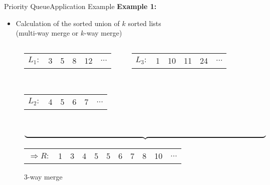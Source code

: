 \begin{frame}{Priority Queue}{Application Example}
  \textbf{Example 1:}
  \begin{itemize}
    \item
      Calculation of the sorted union of $k$ sorted lists\\
      (multi-way merge or $k$-way merge)
  \end{itemize}
  \begin{figure}[!h]
    \begin{columns}
      \begin{column}[t]{0.5\linewidth}
        \begin{tabularx}{\linewidth}{c|X|X|X|X|X|}
          \cline{2-6}
          $L_1:$ & 3 & 5 & 8 & 12 & $\dots$\\
          \cline{2-6}
        \end{tabularx}
        \hfill\\[1.25em]
        \begin{tabularx}{\linewidth}{c|X|X|X|X|X|}
          \cline{2-6}
          $L_2:$ & 4 & 5 & 6 & 7 & $\dots$\\
          \cline{2-6}
        \end{tabularx}
      \end{column}
      \begin{column}[t]{0.5\textwidth}
        \begin{tabularx}{\linewidth}{c|X|X|X|X|X|}
          \cline{2-6}
          $L_3:$ & 1 & 10 & 11 & 24 & $\dots$\\
          \cline{2-6}
        \end{tabularx}
      \end{column}
    \end{columns}
    \hfill\\
    $\underbrace{\hspace{\linewidth}}$\\[0.5em]
    \begin{tabularx}{\linewidth}{c|X|X|X|X|X|X|X|X|X|X|}
      \cline{2-11}
      $\Rightarrow R:$ & 1 & 3 & 4 & 5 & 5 & 6 & 7 & 8 & 10 & $\dots$\\
      \cline{2-11}
    \end{tabularx}
    \caption{3-way merge}
    \label{fig:priority_queue:three_way_merge}
  \end{figure}
\end{frame}



